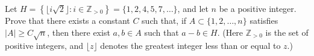 Let $H=\left\{\big\lfloor i\sqrt{2}\big\rfloor:i\in\mathbb{Z}_{>0}\right\}=\{1,2,4,5,7,\ldots\}$, and let $n$ be a positive integer. Prove that there exists a constant $C$ such that, if $A\subset\{1,2,\ldots,n\}$ satisfies $|A|\geq C\sqrt{n}$, then there exist $a,b\in A$ such that $a-b\in H$. (Here $\mathbb{Z}_{>0}$ is the set of positive integers, and $\lfloor z\rfloor$ denotes the greatest integer less than or equal to $z$.)
